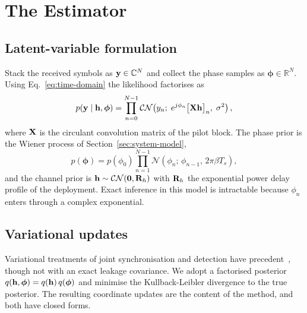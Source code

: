 \section{The \est{} Estimator}
\label{sec:estimator}

\subsection{Latent-variable formulation}

Stack the received symbols as $\mathbf{y} \in \mathbb{C}^{N}$ and collect the
phase samples as $\boldsymbol{\phi} \in \mathbb{R}^{N}$. Using
Eq.~\eqref{eq:time-domain} the likelihood factorises as
\begin{equation}
  \label{eq:likelihood}
  p(\mathbf{y} \mid \mathbf{h}, \boldsymbol{\phi})
  = \prod_{n=0}^{N-1}
    \mathcal{CN}\!\left( y_n ;\;
      e^{j\phi_n} \bigl[\mathbf{X} \mathbf{h}\bigr]_n , \; \sigma^2 \right) ,
\end{equation}
where $\mathbf{X}$ is the circulant convolution matrix of the pilot block. The
phase prior is the Wiener process of Section~\ref{sec:system-model},
\begin{equation}
  \label{eq:phase-prior}
  p(\boldsymbol{\phi}) = p(\phi_0)
    \prod_{n=1}^{N-1} \mathcal{N}\!\left( \phi_n ;\, \phi_{n-1},\,
      2\pi \beta T_s \right) ,
\end{equation}
and the channel prior is $\mathbf{h} \sim \mathcal{CN}(\mathbf{0}, \mathbf{R}_h)$ with
$\mathbf{R}_h$ the exponential power delay profile of the deployment. Exact
inference in this model is intractable because $\phi_n$ enters through a
complex exponential.

\subsection{Variational updates}

Variational treatments of joint synchronisation and detection have precedent~\citep{whitfield2017variational}, though not with an exact leakage covariance. We adopt a factorised posterior
$q(\mathbf{h}, \boldsymbol{\phi}) = q(\mathbf{h}) \, q(\boldsymbol{\phi})$ and
minimise the Kullback-Leibler divergence to the true posterior. The resulting
coordinate updates are the content of the method, and both have closed forms.

